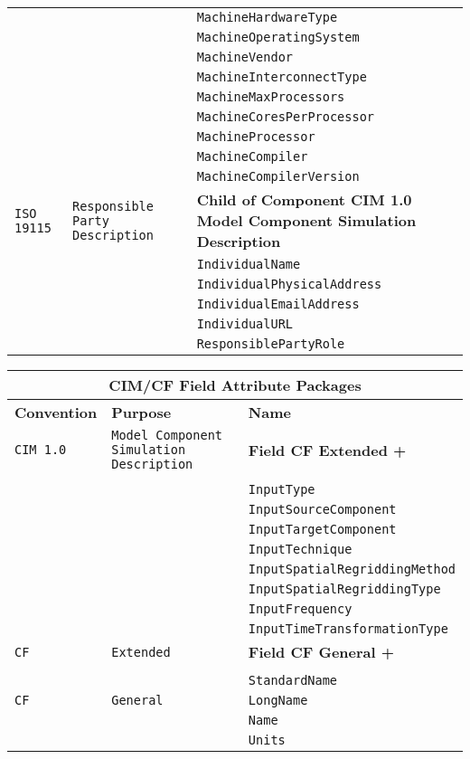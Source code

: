 \begin{tabular}{|p{4cm}|p{4cm}|p{8cm}|}
     & & {\tt MachineHardwareType} \\
     & & {\tt MachineOperatingSystem} \\
     & & {\tt MachineVendor} \\
     & & {\tt MachineInterconnectType} \\
     & & {\tt MachineMaxProcessors} \\
     & & {\tt MachineCoresPerProcessor} \\
     & & {\tt MachineProcessor} \\
     & & {\tt MachineCompiler} \\
     & & {\tt MachineCompilerVersion} \\
\hline
{\tt ISO 19115} & {\tt Responsible Party Description} & {\bf Child of Component CIM 1.0 Model Component Simulation Description}\\
     & & {\tt IndividualName} \\
     & & {\tt IndividualPhysicalAddress} \\
     & & {\tt IndividualEmailAddress} \\
     & & {\tt IndividualURL} \\
     & & {\tt ResponsiblePartyRole} \\
\hline
\end{tabular}

\vspace{5pt}
\label{CIMFieldAttributePackages}
\begin{tabular}{|p{4cm}|p{4cm}|p{6cm}|}
\hline
\multicolumn{3}{|c|}{{\bf \large CIM/CF Field Attribute Packages}} \\
\hline\hline
{\bf Convention} & {\bf Purpose} & {\bf Name} \\
\hline\hline
{\tt CIM 1.0} & {\tt Model Component Simulation Description} & {\bf Field CF Extended +} \\
& & \\
& & {\tt InputType}  \\
 & & {\tt InputSourceComponent} \\ 
 & & {\tt InputTargetComponent} \\ 
 & & {\tt InputTechnique} \\ 
 & & {\tt InputSpatialRegriddingMethod} \\ 
 & & {\tt InputSpatialRegriddingType} \\ 
 & & {\tt InputFrequency} \\ 
 & & {\tt InputTimeTransformationType} \\ 
\hline
{\tt CF} & {\tt Extended} & {\bf Field CF General +} \\
& & \\
& & {\tt StandardName}\\ 
\hline
{\tt CF} & {\tt General} & {\tt LongName}\\
     & & {\tt Name} \\
     & & {\tt Units}  \\
\hline
\end{tabular}

